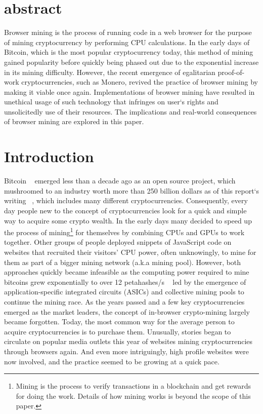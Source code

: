 \section{abstract}

Browser mining is the process of running code in a web browser for the purpose of mining  cryptocurrency by performing CPU calculations. In the early days of Bitcoin, which is the most popular cryptocurrency today, this method of mining gained popularity before quickly being phased out due to the exponential increase in its mining difficulty. However, the recent emergence of egalitarian proof-of-work cryptocurrencies, such as Monero, revived the practice of browser mining by making it viable once again. Implementations of browser mining have resulted in unethical usage of such technology that infringes on user`s rights and unsolicitedly use of their resources. The implications and real-world consequences of browser mining are explored in this paper.

\section{Introduction}

Bitcoin ~\cite{nakamoto2008bitcoin} emerged less than a decade ago as an open source project, which mushroomed to an industry worth more than 250 billion dollars as of this report`s writing ~\cite{coinmarketcap}, which includes many different cryptocurrencies. Consequently, every day people new to the concept of cryptocurrencies look for a quick and simple way to acquire some crypto wealth. In the early days many decided to speed up the process of mining\footnote{Mining is the process to verify transactions in a blockchain and get rewards for doing the work. Details of how mining works is beyond the scope of this paper.} for themselves by combining CPUs and GPUs to work together. Other groups of people deployed snippets of JavaScript code on websites that recruited their visitors’ CPU power, often unknowingly, to mine for them as part of a bigger mining network (a.k.a mining pool). However, both approaches quickly became infeasible as the computing power required to mine bitcoins grew exponentially to over 12 petahashes/s ~\cite{blockchaininfohashrate} led by the emergence of application-specific integrated circuits (ASICs) and collective mining pools to continue the mining race. As the years passed and a few key cryptocurrencies emerged as the market leaders, the concept of in-browser crypto-mining largely became forgotten. Today, the most common way for the average person to acquire cryptocurrencies is to purchase them. Unusually, stories began to circulate on popular media outlets this year of websites mining cryptocurrencies through browsers again. And even more intriguingly, high profile websites were now involved, and the practice seemed to be growing at a quick pace.

